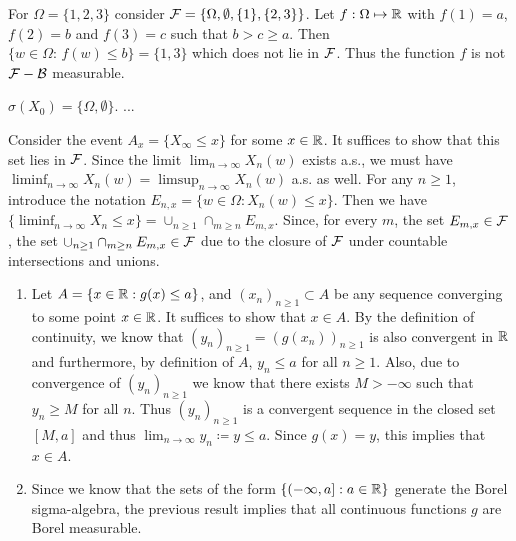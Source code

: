  For $\Omega= \{1,2,3\}$ consider $\mathcal{F}= \{\Omega, \emptyset, \{1\}, \{2,3\}\}$. Let $f:\Omega \mapsto \mathbb{R}$ with $f(1) = a$, $f(2)=b$ and $f(3)=c$ such that $b>c\geq a$. Then $\{w \in \Omega:\, f(w) \leq b\} = \{1, 3\}$ which does not lie in $\mathcal{F}$. Thus the function $f$ is not $\mathcal{F}-\mathcal{B}$ measurable. 


 $\sigma(X_0) = \{\Omega, \emptyset\}$. ...

 Consider the event $A_x = \{X_\infty \leq x\}$ for some $x\in \mathbb{R}$. It suffices to show that this set lies in $\mathcal{F}$. Since the limit $\lim_{n \to \infty}X_n(w)$ exists a.s., we must have $\liminf_{n \to \infty} X_n(w) = \limsup_{n\to \infty} X_n(w)$ a.s. as well. For any $n  \geq 1$, introduce the notation $E_{n,x} = \{w\in \Omega: X_n(w) \leq x\}$. Then we have $\{\liminf_{n \to \infty}X_n \leq x \} = \cup_{n \geq 1} \cap_{m \geq n} E_{m,x}$. Since, for every $m$, the set $E_{m,x} \in \mathcal{F}$, the set $\cup_{n \geq 1} \cap_{m \geq n} E_{m,x} \in \mathcal{F}$ due to the closure of $\mathcal{F}$ under countable intersections and unions. 


\begin{enumerate}[label=(\alph*)]
\item
Let $A = \{x \in \mathbb{R}: g(x) \leq a\}$, and $(x_n)_{n \geq 1} \subset A$ be any sequence converging to some point $x \in \mathbb{R}$. It suffices to show that $x \in A$. By the definition of continuity, we know that $(y_n)_{n \geq 1} = (g(x_n))_{n \geq 1}$ is also convergent in $\mathbb{R}$ and furthermore, by definition of $A$, $y_n \leq a$ for all $n \geq1$. Also, due to convergence of $(y_n)_{n \geq 1}$ we know that there exists $M>-\infty$ such that $y_n \geq M$ for all $n$. Thus $(y_n)_{n \geq 1}$ is a convergent sequence in the closed set $[M, a]$ and thus $\lim_{n \to \infty} y_n \coloneqq y \leq a$. Since $g(x) = y$, this implies that $x \in A$. 
\item 
Since we know that the sets of the form $\{ (-\infty, a]: a\in \mathbb{R}\}$ generate the Borel sigma-algebra, the previous result implies that all continuous functions $g$ are Borel measurable.
\end{enumerate}

